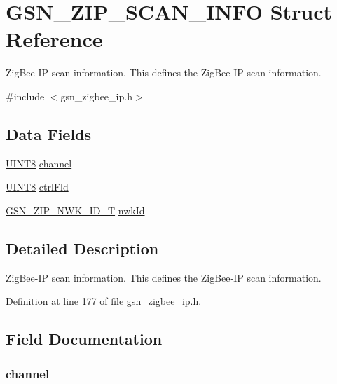 \hypertarget{a00442}{
\section{GSN\_\-ZIP\_\-SCAN\_\-INFO Struct Reference}
\label{a00442}
}


ZigBee-\/IP scan information. This defines the ZigBee-\/IP scan information.  




{\ttfamily \#include $<$gsn\_\-zigbee\_\-ip.h$>$}

\subsection*{Data Fields}
\begin{DoxyCompactItemize}
\item 
\hyperlink{a00660_gab27e9918b538ce9d8ca692479b375b6a}{UINT8} \hyperlink{a00442_a52d69a3bd7bdfdfc6f9e40f4962c575d}{channel}
\item 
\hyperlink{a00660_gab27e9918b538ce9d8ca692479b375b6a}{UINT8} \hyperlink{a00442_afb4fb7889abfa7565fb5948cdd79a786}{ctrlFld}
\item 
\hyperlink{a00441}{GSN\_\-ZIP\_\-NWK\_\-ID\_\-T} \hyperlink{a00442_aa09adf9d6455e0d08084e30083a043cd}{nwkId}
\end{DoxyCompactItemize}


\subsection{Detailed Description}
ZigBee-\/IP scan information. This defines the ZigBee-\/IP scan information. 

Definition at line 177 of file gsn\_\-zigbee\_\-ip.h.



\subsection{Field Documentation}
\hypertarget{a00442_a52d69a3bd7bdfdfc6f9e40f4962c575d}{
\subsubsection[{channel}]{ {\bf channel}}}
\label{a00442_a52d69a3bd7bdfdfc6f9e40f4962c575d}


